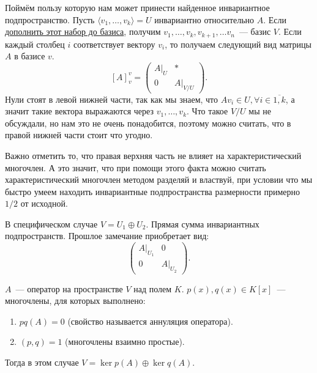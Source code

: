 \begin{remark}
    Поймём пользу которую нам может принести найденное инвариантное подпространство.
    Пусть $\langle v_1,\dots, v_k\rangle = U$ инвариантно относительно $A$. 
    Если \hyperref[thm:О дополнении до базиса]{дополнить этот набор до базиса}, получим 
    $v_1,\dots, v_k, v_{k + 1},\dots v_n$~--- базис $V$.
    Если каждый столбец $i$ соответствует вектору $v_i$, то получаем следующий вид матрицы $A$
    в базисе $v$.
    \[
        [A]^v_v = 
        \left(\begin{array}{c|c}
                A|_U & *\\
                \hline
                0 & A|_{V/U}
        \end{array}\right)
    .\] 
    Нули стоят в левой нижней части, так как мы знаем, что $A v_i \in U, \forall i\in \overline{1,k}$,
    а значит такие вектора выражаются через $v_1,\dots,v_k$.
    Что такое $V/U$ мы не обсуждали, но нам это не очень понадобится, поэтому можно считать, что в правой нижней части стоит что
    угодно. 
    
    Важно отметить то, что правая верхняя часть не влияет на характеристический многочлен.
    А это значит, что при помощи этого факта можно считать характеристический многочлен методом
    разделяй и властвуй, при условии что мы быстро умеем находить инвариантные подпространства
    размерности примерно $1/2$ от исходной.
\end{remark}
\begin{remark}
    В специфическом случае
    $V = U_1 \oplus U_2$. Прямая сумма инвариантных подпространств. Прошлое замечание приобретает вид:
     \[
         \left(\begin{array}{c|c}
                 A|_{U_1} & 0\\
                 \hline
                 0 & A|_{U_2}
         \end{array}\right)
    .\] 
\end{remark}
\begin{theorem}
    $A$~--- оператор на пространстве $V$ над полем $K$. $p(x), q(x) \in K[x]$~--- многочлены, для которых выполнено: 
     \begin{enumerate}
         \item $pq(A) = 0$ (свойство называется аннуляция оператора).
         \item $(p, q) = 1$ (многочлены взаимно простые).
    \end{enumerate}
    Тогда в этом случае $V = \ker p(A) \oplus \ker q(A)$.
\end{theorem}
